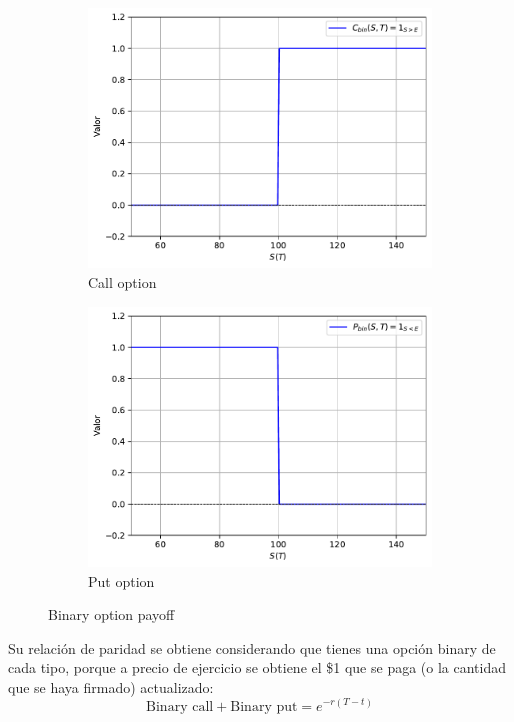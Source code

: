 \begin{figure}[H]
    \centering
    \begin{subfigure}[b]{0.45\linewidth}
        \includegraphics[width=\linewidth]{Imagenes/Parte1/2_Derivados/BinaryCall.pdf}
        \caption{Call option}
    \end{subfigure}
        \begin{subfigure}[b]{0.45\linewidth}
        \includegraphics[width=\linewidth]{Imagenes/Parte1/2_Derivados/BinaryPut.pdf}
        \caption{Put option}
    \end{subfigure}
    \caption{Binary option payoff}
\end{figure}
Su relación de paridad se obtiene considerando que tienes una opción binary de cada tipo, porque a precio de ejercicio se obtiene el \$1 que se paga (o la cantidad que se haya firmado) actualizado:
\[\text{Binary call} + \text{Binary put} = e^{-r(T-t)}\]




